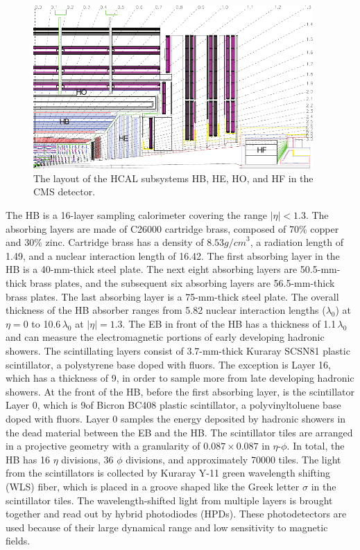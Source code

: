 \documentclass[12pt]{thesis}  %
\begin{document}
\begin{figure}[hbt]
\begin{center}
\includegraphics[width=0.95\textwidth]{figures/HCAL_subdet.pdf}
\caption{The layout of the HCAL subsystems HB, HE, HO, and HF in the CMS detector.}
\label{fig:hcal-layout}
\end{center}
\end{figure}

The HB is a 16-layer sampling calorimeter covering the range $|\eta|<1.3$. The absorbing layers are made of C26000 cartridge brass, composed of 70\% copper and 30\% zinc. Cartridge brass has a density of $8.53\unit{g/cm}^3$, a radiation length of 1.49\cm, and a nuclear interaction length of 16.42\cm. The first absorbing layer in the HB is a 40-mm-thick steel plate. The next eight absorbing layers are 50.5-mm-thick brass plates, and the subsequent six absorbing layers are 56.5-mm-thick brass plates. The last absorbing layer is a 75-mm-thick steel plate. The overall thickness of the HB absorber ranges from 5.82 nuclear interaction lengths ($\lambda_{0}$) at $\eta=0$ to 10.6$\,\lambda_{0}$ at $|\eta|=1.3$. The EB in front of the HB has a thickness of 1.1$\,\lambda_{0}$ and can measure the electromagnetic portions of early developing hadronic showers. The scintillating layers consist of 3.7-mm-thick Kuraray SCSN81 plastic scintillator, a polystyrene base doped with fluors. The exception is Layer 16, which has a thickness of 9\mm, in order to sample more from late developing hadronic showers. At the front of the HB, before the first absorbing layer, is the scintillator Layer 0, which is 9\mm of Bicron BC408 plastic scintillator, a polyvinyltoluene base doped with fluors. Layer 0 samples the energy deposited by hadronic showers in the dead material between the EB and the HB. The scintillator tiles are arranged in a projective geometry with a granularity of $0.087\times0.087$ in $\eta$-$\phi$. In total, the HB has 16 $\eta$ divisions, 36 $\phi$ divisions, and approximately 70000 tiles. The light from the scintillators is collected by Kuraray Y-11 green wavelength shifting (WLS) fiber, which is placed in a groove shaped like the Greek letter $\sigma$ in the scintillator tiles. The wavelength-shifted light from multiple layers is brought together and read out by hybrid photodiodes (HPDs). These photodetectors are used because of their large dynamical range and low sensitivity to magnetic fields.
\end{document}
